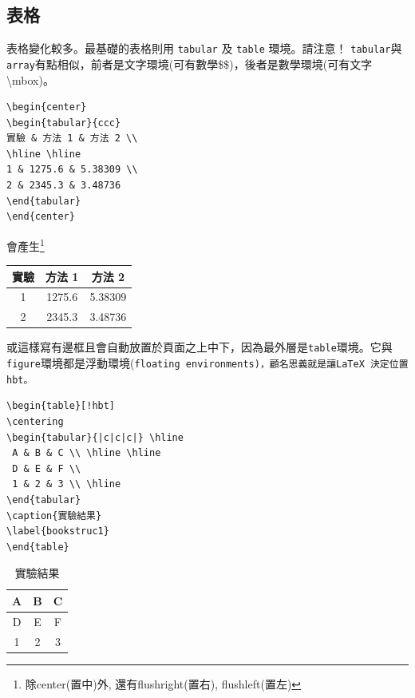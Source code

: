 \subsection{表格}
表格變化較多。最基礎的表格則用 {\tt tabular} 及 {\tt table} 環境。請注意！
{\tt tabular}與{\tt array}有點相似，前者是文字環境(可有數學\$\$)，後者是數學環境(可有文字\textbackslash mbox)。\\
\begin{Verbatim}[frame=single,firstline=1,label=Tabular 1]
\begin{center}
\begin{tabular}{ccc}
實驗 & 方法 1 & 方法 2 \\  
\hline \hline
1 & 1275.6 & 5.38309 \\ 
2 & 2345.3 & 3.48736
\end{tabular}
\end{center}
\end{Verbatim}
會產生\footnote{除center(置中)外, 還有flushright(置右), flushleft(置左)}
\begin{center}
\begin{tabular}{ccc}
實驗 & 方法 1 & 方法 2 \\  \hline \hline \index{\LaTeX!\textbackslash hline}
1 & 1275.6 & 5.38309  \\ 
2 & 2345.3 & 3.48736
\end{tabular}
\end{center}  %
或這樣寫有邊框且會自動放置於頁面之上中下，因為最外層是{\tt table}環境。它與{\tt figure}環境都是浮動環境(\tt floating environments)，顧名思義就是讓\LaTeX\ 決定位置{\tt hbt}。\\ 
\begin{Verbatim}[frame=single,firstline=1,label=Tabular 2]
\begin{table}[!hbt]
\centering
\begin{tabular}{|c|c|c|} \hline 
 A & B & C \\ \hline \hline
 D & E & F \\
 1 & 2 & 3 \\ \hline
\end{tabular}
\caption{實驗結果} 
\label{bookstruc1}
\end{table}
\end{Verbatim}
\begin{table}[!hbt]
\centering  {}
\begin{tabular}{|c|c|c|} \hline        \index{\LaTeX!\textbackslash hline}
A & B & C \\ \hline \hline
D & E & F \\
1 & 2 & 3 \\ \hline 
\end{tabular}
\caption{實驗結果}
\label{bookstruc1} 
\end{table} 
